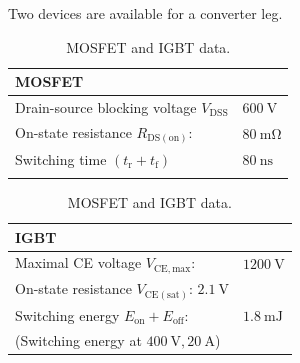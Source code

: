 



Two devices are available for a converter leg.

\begin{table}[h]
  \centering
  \begin{minipage}{0.45\textwidth}
    \centering
    \begin{tabular}{ll}
        \toprule
        \multicolumn{2}{l}{\textbf{MOSFET}} \\
        \midrule
        Drain-source blocking voltage $V_\mathrm{DSS}$ & $\SI{600}{\volt}$\\
        On-state resistance $R_\mathrm{DS(on)}$: & $\SI{80}{\milli\ohm}$ \\
        Switching time $(t_\mathrm{r} + t_\mathrm{f})$ & $\SI{80}{\nano\second}$\\
        \multicolumn{2}{l}{}  \\        
        \bottomrule
    \end{tabular}
  \end{minipage}
  \hfill %
  \begin{minipage}{0.45\textwidth}
    \centering
    \begin{tabular}{ll}
        \toprule
        \multicolumn{2}{l}{\textbf{IGBT}}  \\
        \midrule
        Maximal CE voltage $V_\mathrm{CE,max}$: & $\SI{1200}{\volt}$\\
        On-state resistance $V_\mathrm{CE(sat)}$: $\SI{2.1}{\volt}$ \\
        Switching energy $E_\mathrm{on} + E_\mathrm{off}$: & $\SI{1.8}{\milli\joule}$ \\
        \multicolumn{2}{l}{(Switching energy at $\SI{400}{\volt},\SI{20}{\ampere}$)}  \\        
        \bottomrule
    \end{tabular}
  \end{minipage}
\caption{MOSFET and IGBT data.}
\label{table:mosfet_igbt_data}        
\end{table}


